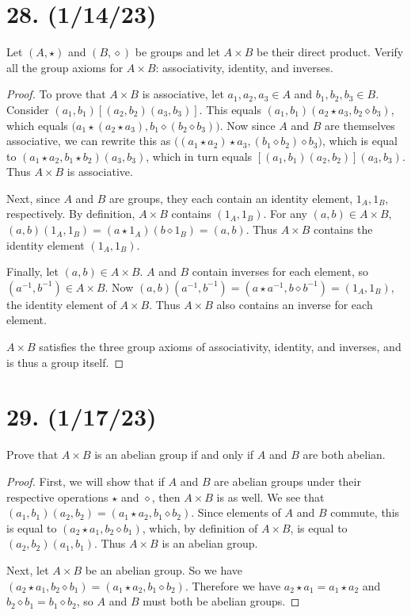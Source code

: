 \documentclass{article}
\begin{document}
\section*{28. (1/14/23)}

Let $(A, \star)$ and $(B, \diamond)$ be groups and let $A \times B$ be their direct product. Verify all the group axioms for $A \times B$: associativity, identity, and inverses.

\begin{proof}
      To prove that $A \times B$ is associative, let $a_1, a_2, a_3 \in A$ and $b_1, b_2, b_3 \in B$. Consider $(a_1, b_1)[(a_2, b_2)(a_3, b_3)]$. This equals $(a_1, b_1)(a_2 \star a_3, b_2 \diamond b_3)$, which equals $\bigl(a_1 \star (a_2 \star a_3), b_1 \diamond (b_2 \diamond b_3)\bigr)$. Now since $A$ and $B$ are themselves associative, we can rewrite this as $\bigl((a_1 \star a_2) \star a_3, (b_1 \diamond b_2) \diamond b_3\bigr)$, which is equal to $(a_1 \star a_2, b_1 \star b_2)(a_3, b_3)$, which in turn equals $[(a_1, b_1)(a_2, b_2)](a_3, b_3)$. Thus $A \times B$ is associative.

      Next, since $A$ and $B$ are groups, they each contain an identity element, $1_A, 1_B$, respectively. By definition, $A \times B$ contains $(1_A, 1_B)$. For any $(a, b) \in A \times B$, $(a, b)(1_A, 1_B) = (a \star 1_A)(b \diamond 1_B) = (a, b)$. Thus $A \times B$ contains the identity element $(1_A, 1_B)$.

      Finally, let $(a, b) \in A \times B$. $A$ and $B$ contain inverses for each element, so $(a^{-1}, b^{-1}) \in A \times B$. Now $(a, b)(a^{-1}, b^{-1}) = (a \star a^{-1}, b \diamond b^{-1}) = (1_A, 1_B)$, the identity element of $A \times B$. Thus $A \times B$ also contains an inverse for each element.

      $A \times B$ satisfies the three group axioms of associativity, identity, and inverses, and is thus a group itself.
\end{proof}

\section*{29. (1/17/23)}

Prove that $A \times B$ is an abelian group if and only if $A$ and $B$ are both abelian.

\begin{proof}
      First, we will show that if $A$ and $B$ are abelian groups under their respective operations $\star$ and $\diamond$, then $A \times B$ is as well. We see that $(a_1, b_1)(a_2, b_2) = (a_1 \star a_2, b_1 \diamond b_2)$. Since elements of $A$ and $B$ commute, this is equal to $(a_2 \star a_1, b_2 \diamond b_1)$, which, by definition of $A \times B$, is equal to $(a_2, b_2)(a_1, b_1)$. Thus $A \times B$ is an abelian group.

      Next, let $A \times B$ be an abelian group. So we have $(a_2 \star a_1, b_2 \diamond b_1) = (a_1 \star a_2, b_1 \diamond b_2)$. Therefore we have $a_2 \star a_1 = a_1 \star a_2$ and $b_2 \diamond b_1 = b_1 \diamond b_2$, so $A$ and $B$ must both be abelian groups.
\end{proof}
\end{document}
